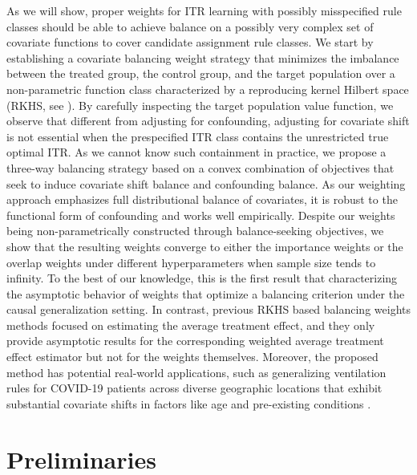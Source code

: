 \documentclass[12pt]{article}
\begin{document}
As we will show, proper weights for ITR learning with possibly misspecified rule classes should be able to achieve balance on a possibly very complex set of covariate functions to cover candidate assignment rule classes. We start by establishing a covariate balancing weight strategy that minimizes the imbalance between the treated group, the control group, and the target population over a non-parametric function class characterized by a reproducing kernel Hilbert space (RKHS, see \citet{wahba1990spline}). By carefully inspecting the target population value function, we observe that different from adjusting for confounding, adjusting for covariate shift is not essential when the prespecified ITR class contains the unrestricted true optimal ITR. As we cannot know such containment in practice, we propose a three-way balancing strategy based on a convex combination of objectives that seek to induce covariate shift balance and confounding balance. As our weighting approach emphasizes full distributional balance of covariates, it is robust to the functional form of confounding and works well empirically. 
Despite our weights being non-parametrically constructed through balance-seeking objectives, we show that the resulting weights converge to either the importance weights or the overlap weights under different hyperparameters when sample size tends to infinity. To the best of our knowledge, this is the first result that characterizing the asymptotic behavior of weights that optimize a balancing criterion under the causal generalization setting. In contrast, previous RKHS based balancing weights methods \citep{wong2018kernel,kallus2020generalized,kallus2022optimal} focused on estimating the average treatment effect, and they only provide asymptotic results for the corresponding weighted average treatment effect estimator but not for the weights themselves. Moreover, the proposed method has potential real-world applications, such as generalizing ventilation rules for COVID-19 patients across diverse geographic locations that exhibit substantial covariate shifts in factors like age and pre-existing conditions  \citep{kyono2023selecting}.

\section{Preliminaries}
\label{sec:framework}
\end{document}
